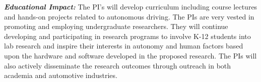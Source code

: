 \noindent\emph{\textbf{Educational Impact:}} The PI's will develop curriculum including course lectures and hands-on projects related to autonomous driving. The PIs are very vested in promoting and employing undergraduate researchers. They will continue developing and participating in research programs to involve K-12 students into lab research and inspire their interests in autonomy and human factors based upon the hardware and software developed in the proposed research. The PIs will also actively disseminate the research outcomes through outreach in both academia and automotive industries.















